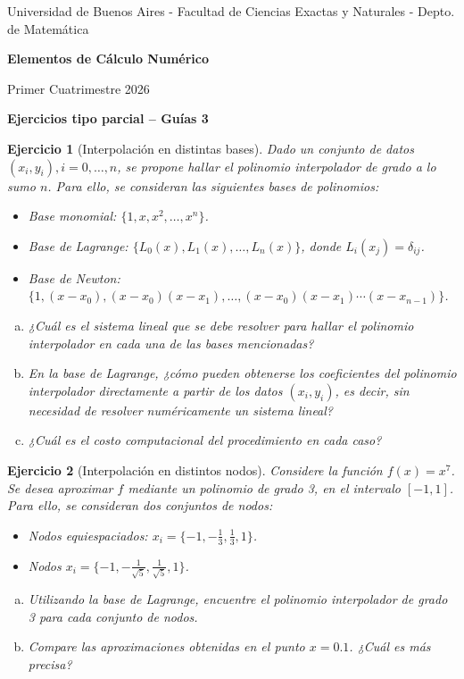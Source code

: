 \documentclass[12pt]{article}
\newtheorem{exercise}{Ejercicio}
\begin{document}
\centerline{{\small Universidad de Buenos Aires - Facultad de Ciencias Exactas y Naturales - Depto. de Matemática}}
 
 \vskip 0.2cm
 \hrulefill
 \vskip 0.2cm

 \centerline{{\bf\Huge {\sc Elementos de Cálculo Numérico}}}
 \vskip 0.2cm
 \centerline{\ttfamily Primer Cuatrimestre 2026}
 \hrulefill

 \bigskip
 \centerline{\bf Ejercicios tipo parcial -- Guías 3}
 \bigskip

\begin{exercise}[Interpolación en distintas bases]
Dado un conjunto de datos $(x_i,y_i), i=0,\dots,n$, se propone hallar el polinomio interpolador de grado a lo sumo $n$. Para ello, se consideran las siguientes bases de polinomios:
\begin{itemize}
\item Base monomial: $\{1,x,x^2,\dots,x^n\}$.
\item Base de Lagrange: $\{L_0(x),L_1(x),\dots,L_n(x)\}$, donde $L_i(x_j)=\delta_{ij}$.
\item Base de Newton: $\{1,(x-x_0),(x-x_0)(x-x_1),\dots,(x-x_0)(x-x_1)\cdots(x-x_{n-1})\}$.
\end{itemize}


\begin{enumerate}[(a)]
\item ¿Cuál es el sistema lineal que se debe resolver para hallar el polinomio interpolador en cada una de las bases mencionadas?
\item En la base de Lagrange, ¿cómo pueden obtenerse los coeficientes del polinomio interpolador directamente a partir de los datos $(x_i,y_i)$, es decir, sin necesidad de resolver numéricamente un sistema lineal?
\item ¿Cuál es el costo computacional del procedimiento en cada caso?
\end{enumerate}
\end{exercise}


\begin{exercise}[Interpolación en distintos nodos]
Considere la función $f(x) = x^7$. Se desea aproximar $f$ mediante un polinomio de grado 3, en el intervalo $[-1,1]$. Para ello, se consideran dos conjuntos de nodos:
\begin{itemize}
\item Nodos equiespaciados: $x_i = \lbrace -1, -\frac{1}{3}, \frac{1}{3}, 1\rbrace$.
\item Nodos $x_i = \lbrace-1, -\frac{1}{\sqrt{5}}, \frac{1}{\sqrt{5}}, 1\rbrace$.
\end{itemize}
\begin{enumerate}[(a)]
\item Utilizando la base de Lagrange, encuentre el polinomio interpolador de grado 3 para cada conjunto de nodos.
\item Compare las aproximaciones obtenidas en el punto $x=0.1$. ¿Cuál es más precisa?
\end{enumerate}
\end{exercise}
\end{document}
